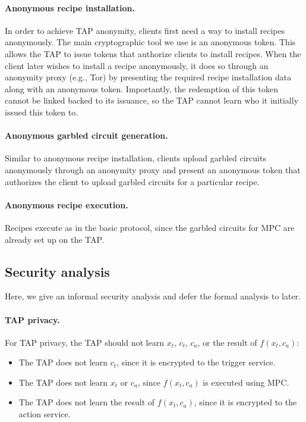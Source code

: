 \paragraph{Anonymous recipe installation.} In order to achieve TAP anonymity,
clients first need a way to install recipes anonymously. The main cryptographic
tool we use is an anonymous token. This allows the TAP to issue tokens that
authorize clients to install recipes. When the client later wishes to install a
recipe anonymously, it does so through an anonymity proxy (e.g., Tor) by
presenting the required recipe installation data along with an anonymous
token. Importantly, the redemption of this token cannot be linked backed to its
issuance, so the TAP cannot learn who it initially issued this token to.

\paragraph{Anonymous garbled circuit generation.}
Similar to anonymous recipe installation, clients upload garbled circuits
anonymously through an anonymity proxy and present an anonymous token that
authorizes the client to upload garbled circuits for a particular recipe.

\paragraph{Anonymous recipe execution.} Recipes execute as in the basic
protocol, since the garbled circuits for MPC are already set up on the TAP.

\subsection{Security analysis}

Here, we give an informal security analysis and defer the formal analysis to
later.

\paragraph{TAP privacy.} For TAP privacy, the TAP should not learn $x_t$, $c_t$,
$c_a$, or the result of $f(x_t, c_a)$:
\begin{itemize}
  \item The TAP does not learn $c_t$, since it is encrypted to the trigger
    service.
  \item The TAP does not learn $x_t$ or $c_a$, since $f(x_t, c_a)$ is executed
    using MPC.
  \item The TAP does not learn the result of $f(x_t, c_a)$, since it is
    encrypted to the action service.
\end{itemize}

